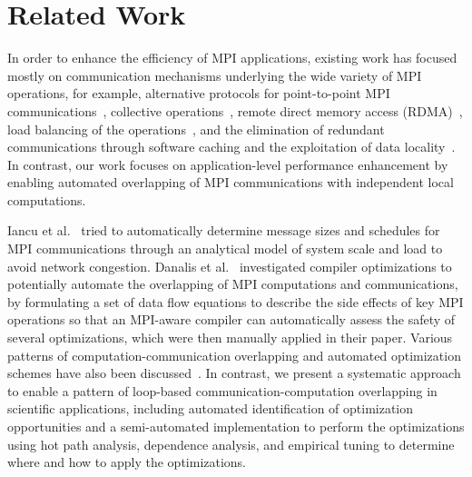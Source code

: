 \section{Related Work}
\label{sec-related}

In order to enhance the efficiency of MPI applications, existing work
has focused mostly on communication mechanisms underlying the wide
variety of MPI operations, for example, alternative protocols for
point-to-point MPI
communications~\cite{brightwell:eurompi03,denis:eurompi11}, collective
operations~\cite{traff:eurompi14:ocd,traff:eurompi14:mcd,graham:eurompi08,mittal:ppopp12},
remote direct memory access
(RDMA)~\cite{liu:ics03,woodall:eurompi06,hatanaka:eurompi13}, load
balancing of the operations~\cite{nian:niss09,kale:eurompi14}, and the
elimination of redundant communications through software caching and
the exploitation of data
locality~\cite{buntinas:icpp09,isujita:eurompi14,ozog:ics13}.  In
contrast, our work focuses on application-level performance
enhancement by enabling automated overlapping of MPI communications
with independent local computations.

Iancu et al.~\cite{iancu:ppopp07} tried to automatically determine
message sizes and schedules for MPI communications through an
analytical model of system scale and load to avoid network congestion.
Danalis et al.~\cite{danalis:ics09} investigated compiler
optimizations to potentially automate the overlapping of MPI
computations and communications, by formulating a set of data flow
equations to describe the side effects of key MPI operations so that
an MPI-aware compiler can automatically assess the safety of several
optimizations, which were then manually applied in their paper.
Various patterns of computation-communication overlapping and
automated optimization schemes have also been
discussed~\cite{danalis:sc05,fishgold:ipdps06}.  In contrast, we
present a systematic approach to enable a pattern of loop-based
communication-computation overlapping in scientific applications,
including automated identification of optimization opportunities and a
semi-automated implementation to perform the optimizations using hot
path analysis, dependence analysis, and empirical tuning to determine
where and how to apply the optimizations.


